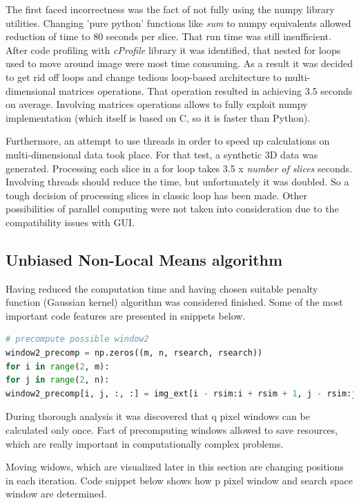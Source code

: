 The first faced incorrectness was the fact of not fully using the numpy library utilities. Changing 'pure python' functions like \textit{sum} to numpy equivalents allowed reduction of time to 80 seconds per slice. That run time was still insufficient. After code profiling with \textit{cProfile} library it was identified, that nested for loops used to move around image were most time consuming. As a result it was decided to get rid off loops and change tedious loop-based architecture to multi-dimensional matrices operations. That operation resulted in achieving 3.5 seconds on average. Involving matrices operations allows to fully exploit numpy implementation (which itself is based on C, so it is faster than Python).

Furthermore, an attempt to use threads in order to speed up calculations on multi-dimensional data took place. For that test, a synthetic 3D data was generated. Processing each slice in a for loop takes 3.5 x \textit{number of slices} seconds. Involving threads should reduce the time, but unfortunately it was doubled. So a tough decision of processing slices in classic loop has been made. Other possibilities of parallel computing were not taken into consideration due to the compatibility issues with GUI.

\subsection*{Unbiased Non-Local Means algorithm}
Having reduced the computation time and having chosen suitable penalty function (Gaussian kernel) algorithm was considered finished. Some of the most important code features are presented in snippets below.

\begin{lstlisting}[language=Python, caption = Overcoming computation of same matrices in every iteration.]
# precompute possible window2
window2_precomp = np.zeros((m, n, rsearch, rsearch))
for i in range(2, m):
for j in range(2, n):
window2_precomp[i, j, :, :] = img_ext[i - rsim:i + rsim + 1, j - rsim:j + rsim + 1]
\end{lstlisting}

During thorough analysis it was discovered that q pixel windows can be calculated only once. Fact of precomputing windows allowed to save resources, which are really important in computationally complex problems.

Moving widows, which are visualized later in this section are changing positions in each iteration. Code snippet below shows how p pixel window and search space window are determined.

